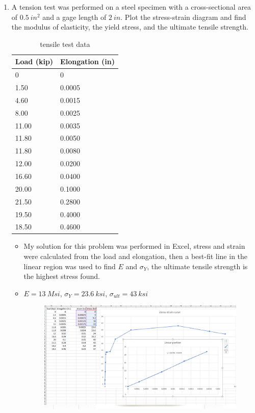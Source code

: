 \documentclass[12pt, oneside]{article}
\let\US\SI
\begin{document}
\begin{enumerate}
	\item %
		A tension test was performed on a steel specimen with a cross-sectional area of $\US{0.5}{in^2}$ and a gage length of $\US{2}{in}$.
		Plot the stress-strain diagram and find the modulus of elasticity, the yield stress, and the ultimate tensile strength.
		\begin{table}[H]
			\centering
			\caption{tensile test data}
			\label{tab:label}
			\begin{tabular}{l|l}
				\textbf{Load (kip)} & \textbf{Elongation (in)}\\
				\midrule
				0 & 0\\
				1.50 & 0.0005\\
				4.60 & 0.0015\\ 
				8.00 & 0.0025\\ 
				11.00 & 0.0035\\ 
				11.80 & 0.0050\\ 
				11.80 & 0.0080\\ 
				12.00 & 0.0200\\ 
				16.60 & 0.0400\\
				20.00 & 0.1000\\ 
				21.50 & 0.2800\\ 
				19.50 & 0.4000\\ 
				18.50 & 0.4600\\ 
			\end{tabular}
		\end{table}
		\begin{itemize}
			\item My solution for this problem was performed in Excel, stress and strain were calculated from the load and elongation, then a best-fit line in the linear region was used to find $E$ and $\sigma_Y$, the ultimate tensile strength is the highest stress found.
			\item $E = 	\US{13}{Msi}$, $\sigma_Y = 	\US{23.6}{ksi}$, $\sigma_{ult} = 	\US{43}{ksi} $
			\begin{figure}[H]
				\centering
				\includegraphics[width=0.7\linewidth]{hw2-5}
			\end{figure}
		\end{itemize}


\end{enumerate}
\end{document}
